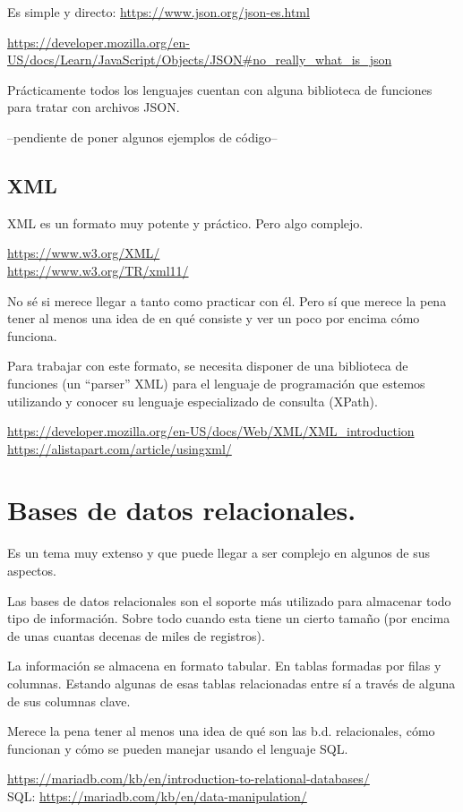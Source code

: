 \documentclass[spanish,12pt,a4paper,final,oneside]{book}
\begin{document}
Es simple y directo:  \url{https://www.json.org/json-es.html}

\url{https://developer.mozilla.org/en-US/docs/Learn/JavaScript/Objects/JSON#no_really_what_is_json}

Prácticamente todos los lenguajes cuentan con alguna biblioteca de funciones para tratar con archivos JSON.

--pendiente de poner algunos ejemplos de código--


\subsection{XML}
XML es un formato muy potente y práctico. Pero algo complejo.

\url{https://www.w3.org/XML/}
\\ \url{https://www.w3.org/TR/xml11/}

No sé si merece llegar a tanto como practicar con él. Pero sí que merece la pena tener al menos una idea de en qué consiste y ver un poco por encima cómo funciona.

Para trabajar con este formato, se necesita disponer de una biblioteca de funciones (un ``parser'' XML) para el lenguaje de programación que estemos utilizando y conocer su lenguaje especializado de consulta (XPath).

\url{https://developer.mozilla.org/en-US/docs/Web/XML/XML_introduction}
\\ \url{https://alistapart.com/article/usingxml/}


\section{Bases de datos relacionales.}
Es un tema muy extenso y que puede llegar a ser complejo en algunos de sus aspectos.

Las bases de datos relacionales son el soporte más utilizado para almacenar todo tipo de información. Sobre todo cuando esta tiene un cierto tamaño (por encima de unas cuantas decenas de miles de registros).

La información se almacena en formato tabular. En tablas formadas por filas y columnas. Estando algunas de esas tablas relacionadas entre sí a través de alguna de sus columnas clave.

Merece la pena tener al menos una idea de qué son las b.d. relacionales, cómo funcionan y cómo se pueden manejar usando el lenguaje SQL.

\url{https://mariadb.com/kb/en/introduction-to-relational-databases/}
\\ SQL: \url{https://mariadb.com/kb/en/data-manipulation/}
\end{document}
